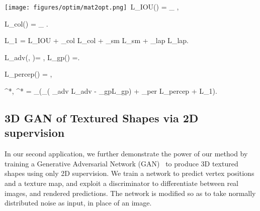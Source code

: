 \documentclass{article}
\DeclareMathOperator*{\argmax}{arg\,max}
\DeclareMathOperator*{\argmin}{arg\,min}
\begin{document}
    \begin{minipage}[t] {0.09\textwidth}
    \centering
    \texttt{[image: figures/optim/mat2opt.png]}\
L_{IOU}(\theta) = _{} ,

L_{col}(\theta) = _{} .

L_{1} = L_{IOU} + \lambda_{col} L_{col} + \lambda_{sm} L_{sm} + \lambda_{lap} L_{lap}.
\vspace{-5pt}

L_{adv}(\theta, \phi)= ,\quad
L_{gp}(\phi) =\mathop{\mathbb{E_{\tilde{I}}}}.
 
L_{percep}(\phi) =  \left[\sum_{i=1}^{M_{V}} \frac{1}{N_i^V} || V^i(I) - V^i( \tilde{I}) ||_1  + \sum_{i=1}^{M_{D}} \frac{1}{N_i^D} || D^i(I;\phi) - D^i( \tilde{I};\phi) ||_1 \right], 

\theta^*, \phi^* = \argmin \limits_{\theta}\bigg(\argmax\limits_{\phi}\left( \lambda_{adv} L_{adv} - \lambda_{gp}L_{gp}\right) +  \lambda_{per} L_{percep}  +  L_{1}\bigg).
















\vspace{-10pt}
\subsection{3D GAN of Textured Shapes via 2D supervision}
\vspace{-5pt}
In our second application, we further demonstrate the power of our method by training a Generative Adversarial Network (GAN)~\cite{goodfellow2014generative} to produce 3D textured shapes using only 2D supervision. We train a network  to predict vertex positions and a texture map, and exploit a discriminator  to differentiate between real images, and rendered predictions. The network  is modified so as to take normally distributed noise as input, in place of an image. 


\end{minipage}
\end{document}
